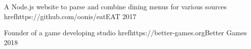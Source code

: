 
\begin{cventries}
    \cventry
    {A Node.js website to parse and combine dining menus for various sources}
    {href{https://github.com/oonis/eat}{EAT}}
    {}
    {2017}
    {
    }

    \cventry
    {Founder of a game developing studio}
    {href{https://better-games.org}{Better Games}}
    {}
    {2018}
    {
    }
\end{cventries}
